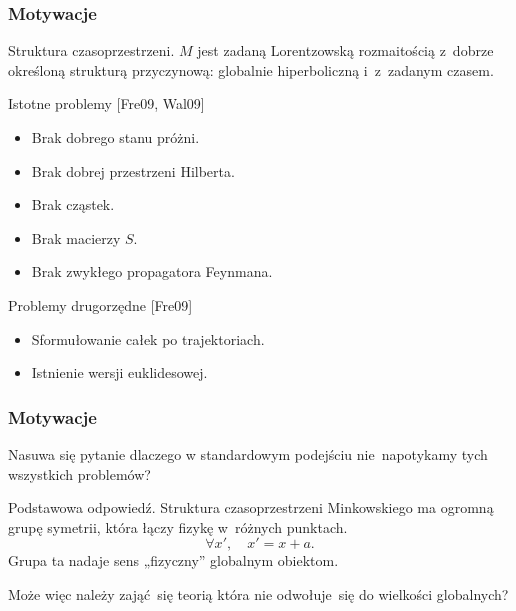 \documentclass[10pt,t]{beamer}
\begin{document}
\begin{frame}
  \frametitle{Motywacje}


  Struktura czasoprzestrzeni. $M$ jest zadaną Lorentzowską rozmaitością
  z~dobrze określoną
  strukturą przyczynową: globalnie hiperboliczną i~z~zadanym czasem.

  Istotne problemy [Fre09, Wal09]
  \begin{itemize}
    \RaggedRight

  \item Brak dobrego stanu próżni.

  \item Brak dobrej przestrzeni Hilberta.

  \item Brak cząstek.

  \item Brak macierzy $S$.

  \item Brak zwykłego propagatora Feynmana.

  \end{itemize}



  Problemy drugorzędne [Fre09]
  \begin{itemize}
    \RaggedRight

  \item Sformułowanie całek po trajektoriach.

  \item Istnienie wersji euklidesowej.

  \end{itemize}

\end{frame}





\begin{frame}
  \frametitle{Motywacje}


  Nasuwa się pytanie dlaczego w standardowym podejściu nie~napotykamy tych
  wszystkich problemów?

  Podstawowa odpowiedź.
  Struktura czasoprzestrzeni Minkowskiego ma ogromną grupę symetrii,
  która łączy fizykę w~różnych punktach.
  \begin{equation}
    \label{eq:Rachunek-zaburzen-01}
    \forall x', \quad
    x' = x + a.
  \end{equation}
  Grupa ta nadaje sens „fizyczny” globalnym obiektom.

  Może więc należy zająć~się teorią która nie odwołuje~się do wielkości
  globalnych?

\end{frame}
\end{document}

